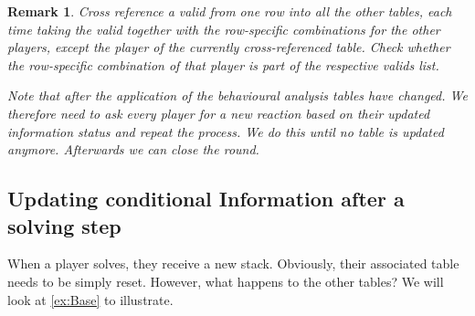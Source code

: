 \documentclass{article}
\newtheorem{remark}{Remark}[section]
\begin{document}
\begin{remark}
Cross reference a valid from one row into all the other tables, each time taking the valid together with the row-specific combinations for the other players, except the player of the currently cross-referenced table. Check whether the row-specific combination of that player is part of the respective valids list.

Note that after the application of the behavioural analysis tables have changed. We therefore need to ask every player for a new reaction based on their updated information status and repeat the process. We do this until no table is updated anymore. Afterwards we can close the round.

\end{remark}

\subsection{Updating conditional Information after a solving step}

When a player solves, they receive a new stack. Obviously, their associated table needs to be simply reset. However, what happens to the other tables? We will look at \cref{ex:Base} to illustrate.
\end{document}
